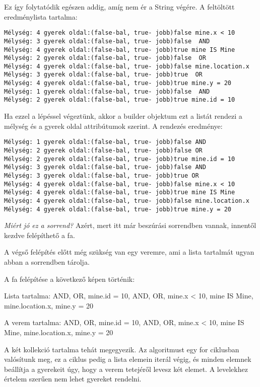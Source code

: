 Ez így folytatódik egészen addig, amíg nem ér a String végére. A feltöltött eredménylista tartalma:

\begin{verbatim}
Mélység: 4 gyerek oldal:(false-bal, true- jobb)false mine.x < 10
Mélység: 3 gyerek oldal:(false-bal, true- jobb)false  AND
Mélység: 4 gyerek oldal:(false-bal, true- jobb)true mine IS Mine 
Mélység: 2 gyerek oldal:(false-bal, true- jobb)false  OR
Mélység: 4 gyerek oldal:(false-bal, true- jobb)false mine.location.x 
Mélység: 3 gyerek oldal:(false-bal, true- jobb)true  OR
Mélység: 4 gyerek oldal:(false-bal, true- jobb)true mine.y = 20 
Mélység: 1 gyerek oldal:(false-bal, true- jobb)false  AND
Mélység: 2 gyerek oldal:(false-bal, true- jobb)true mine.id = 10 
\end{verbatim}

Ha ezzel a lépéssel végeztünk, akkor a builder objektum ezt a listát rendezi a mélység és a gyerek oldal attribútumok szerint.
A rendezés eredménye:

\begin{verbatim}
Mélység: 1 gyerek oldal:(false-bal, true- jobb)false AND
Mélység: 2 gyerek oldal:(false-bal, true- jobb)false OR
Mélység: 2 gyerek oldal:(false-bal, true- jobb)true mine.id = 10
Mélység: 3 gyerek oldal:(false-bal, true- jobb)false AND
Mélység: 3 gyerek oldal:(false-bal, true- jobb)true OR
Mélység: 4 gyerek oldal:(false-bal, true- jobb)false mine.x < 10
Mélység: 4 gyerek oldal:(false-bal, true- jobb)true mine IS Mine
Mélység: 4 gyerek oldal:(false-bal, true- jobb)false mine.location.x
Mélység: 4 gyerek oldal:(false-bal, true- jobb)true mine.y = 20
\end{verbatim}

\textit{Miért jó ez a sorrend?}
Azért, mert itt már beszúrási sorrendben vannak, innentől kezdve felépíthető a fa.

A végső felépítés előtt még szükség van egy veremre, ami a lista tartalmát ugyan abban a sorrendben tárolja.

A fa felépítése a következő képen történik:

Lista tartalma: AND, OR, mine.id = 10, AND, OR, mine.x < 10, mine IS Mine, mine.location.x, mine.y = 20

A verem tartalma: AND, OR, mine.id = 10, AND, OR, mine.x < 10, mine IS Mine, mine.location.x, mine.y = 20

A két kollekció tartalma tehát megegyezik. Az algoritmust egy for ciklusban valósítunk meg, ez a ciklus pedig a lista elemein iterál végig, és minden elemnek beállítja a gyerekeit úgy, hogy a verem tetejéről levesz két elemet.
A levelekhez értelem szerűen nem lehet gyereket rendelni.

